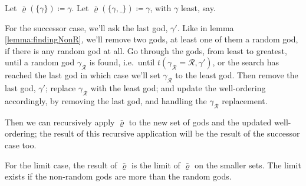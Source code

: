 \documentclass[twoside,twocolumn,a4paper,11pt]{article}
\theoremstyle{definition}
\begin{document}
Let $\bar{\varrho}(\{\gamma\})\coloneqq\gamma$.
Let $\bar{\varrho}(\{\gamma,\_\})\coloneqq\gamma$, 
with $\gamma$ least,
say.

For the successor case,
we'll ask the last god, $\gamma'$.
Like in lemma \ref{lemma:findingNonR}, we'll remove two gods, at least one of them a random god, if there is any random god at all.
Go through the gods, from least to greatest, 
until a random god $\gamma_\mathcal{\scriptscriptstyle R}$ is found,
i.e.\ until 
$t(\gamma_\mathcal{\scriptscriptstyle R}=\mathcal{R},\gamma')$,
or the search has reached the last god
in which case we'll set $\gamma_\mathcal{\scriptscriptstyle R}$ to the least god.
Then remove the last god, $\gamma'$;  
replace $\gamma_\mathcal{\scriptscriptstyle R}$ with the least god;
and update the well-ordering accordingly, by removing the last god,
and handling the $\gamma_\mathcal{\scriptscriptstyle R}$ replacement.

Then we can recursively apply $\bar{\varrho}$ to the new set of gods and
the updated well-ordering;
the result of this recursive application will be the result of the successor case too.

For the limit case,
the result of $\bar{\varrho}$ is the limit of $\bar{\varrho}$ on the smaller sets.
The limit exists if the non-random gods are more than the random gods.
\end{document}
